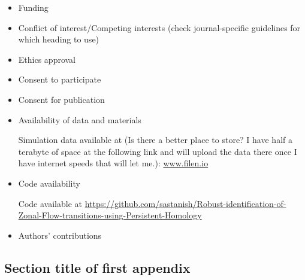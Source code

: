 \documentclass[pdflatex,sn-aps]{sn-jnl}%
\theoremstyle{thmstyleone}%
\theoremstyle{thmstyletwo}%
\theoremstyle{thmstylethree}%
\begin{document}
\begin{itemize}
\item Funding
\item Conflict of interest/Competing interests (check journal-specific guidelines for which heading to use)
\item Ethics approval 
\item Consent to participate
\item Consent for publication
\item Availability of data and materials
\par
Simulation data available at (Is there a better place to store?  I have half a terabyte of space at the following link and will upload the data there once I have internet speeds that will let me.): \url{www.filen.io}
\item Code availability 
\par
Code available at \url{https://github.com/sastanish/Robust-identification-of-Zonal-Flow-transitions-using-Persistent-Homology}
\item Authors' contributions
\end{itemize}

\begin{appendices}

\section{Section title of first appendix}\label{secA1}
\end{appendices}



\end{document}
